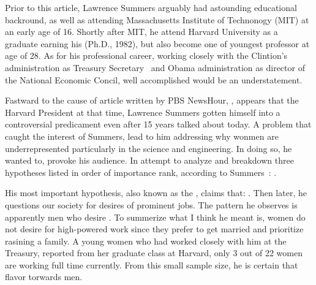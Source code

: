 
\par
Prior to this article, Lawrence Summers arguably had astounding educational backround, 
as well as attending Massachusetts Institute of Technonogy (MIT) at an early age of 16.
Shortly after MIT, he attend Harvard University as a graduate earning his (Ph.D., 1982),
but also become one of youngest professor at age of 28.\cite{summersedu} As for his
professional career, working closely with the Clintion's administration as Treasury 
Secretary~\cite{ustreasury} and Obama administration as director of the National Economic
Concil,\cite{economicconcil} well accomplished would be an understatement.

\par
Fastward to the cause of article written by PBS NewsHour, ,\cite{summers} appears that the Harvard 
President at that time, Lawrence Summers gotten himself into a controversial predicament 
even after 15 years talked about today. A problem that caught the interest of Summers, 
lead to him addressing why wonmen are underrepresented particularly in the science and 
engineering. In doing so, he wanted to,  provoke his audience. In attempt to
analyze and breakdown three hypotheses listed in order of importance rank, according to 
Summers~\cite{summers}: 
.

\par
His most important hypothesis, also known as the ,
claims that: \cite{summers}. Then later,
he questions our society for desires of prominent jobs. The pattern he observes is apparently
men who desire \cite{summers}. To summerize what I think he
meant is, women do not desire for high-powered work since they prefer to get married and 
prioritize rasining a family. A young women who had worked closely with him at the Treasury,
reported from her graduate class at Harvard, only 3 out of 22 women are working full time 
currently. From this small sample size, he is certain that 
flavor torwards men.

